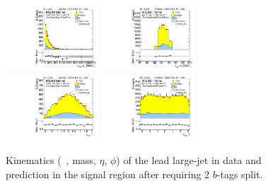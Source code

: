 \clearpage

\begin{figure}[htbp!]
\begin{center}
\includegraphics[width=0.31\textwidth,angle=-90]{figures/boosted/Signal/b77_TwoTag_split_Signal_leadHCand_Pt_m.pdf}
\includegraphics[width=0.31\textwidth,angle=-90]{figures/boosted/Signal/b77_TwoTag_split_Signal_leadHCand_Mass_s.pdf}\\
\includegraphics[width=0.31\textwidth,angle=-90]{figures/boosted/Signal/b77_TwoTag_split_Signal_leadHCand_Eta.pdf}
\includegraphics[width=0.31\textwidth,angle=-90]{figures/boosted/Signal/b77_TwoTag_split_Signal_leadHCand_Phi.pdf}
  \caption{Kinematics (\pt~, mass, $\eta$, $\phi$) of the lead large-\R jet in data and prediction in the signal region after requiring 2 $b$-tags split. }
  \label{fig:boosted-2bs-signal-ak10-lead}
\end{center}
\end{figure}

